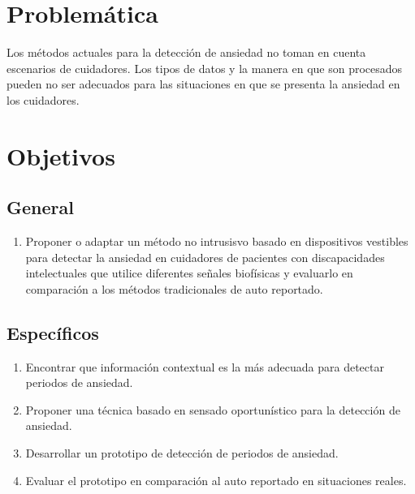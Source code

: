 \documentclass[letterpaper,12pt]{cicese}
\begin{document}
		\chapter{Problem\'atica}
			Los m\'etodos actuales para la detecci\'on de ansiedad no toman en cuenta escenarios de cuidadores. Los tipos de datos y la manera en que son procesados pueden no ser adecuados para las situaciones en que se presenta la ansiedad en los cuidadores.
		\chapter{Objetivos}
			\section{General}
				\begin{enumerate}
					\item Proponer o adaptar un m\'etodo no intrusisvo basado en dispositivos vestibles para detectar la ansiedad en cuidadores de pacientes con discapacidades intelectuales que utilice diferentes se\~nales biof\'isicas y evaluarlo en comparaci\'on a los m\'etodos tradicionales de auto reportado.
				\end{enumerate}
			\section{Espec\'ificos}
				\begin{enumerate}
					\item Encontrar que informaci\'on contextual es la m\'as adecuada para detectar periodos de ansiedad.
					\item Proponer una t\'ecnica basado en sensado oportun\'istico para la detecci\'on de ansiedad.
					\item Desarrollar un prototipo de detecci\'on de periodos de ansiedad.
					\item Evaluar el prototipo en comparaci\'on al auto reportado en situaciones reales.
				\end{enumerate}
\end{document}
